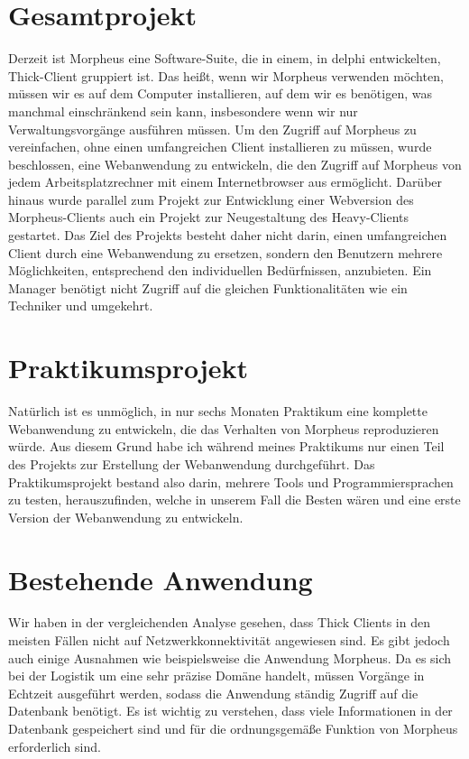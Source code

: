 \documentclass[a4paper, 12pt, french]{article}
\begin{document}
		\section{Gesamtprojekt}
			Derzeit ist Morpheus eine Software-Suite, die in einem, in \gls{delphi} entwickelten, Thick-Client gruppiert ist. Das heißt, wenn wir Morpheus verwenden möchten, müssen wir es auf dem Computer installieren, auf dem wir es benötigen, was manchmal einschränkend sein kann, insbesondere wenn wir nur Verwaltungsvorgänge ausführen müssen. Um den Zugriff auf Morpheus zu vereinfachen, ohne einen umfangreichen Client installieren zu müssen, wurde beschlossen, eine Webanwendung zu entwickeln, die den Zugriff auf Morpheus von jedem Arbeitsplatzrechner mit einem Internetbrowser aus ermöglicht. Darüber hinaus wurde parallel zum Projekt zur Entwicklung einer Webversion des Morpheus-Clients auch ein Projekt zur Neugestaltung des Heavy-Clients gestartet. Das Ziel des Projekts besteht daher nicht darin, einen umfangreichen Client durch eine Webanwendung zu ersetzen, sondern den Benutzern mehrere Möglichkeiten, entsprechend den individuellen Bedürfnissen, anzubieten. Ein Manager benötigt nicht Zugriff auf die gleichen Funktionalitäten wie ein Techniker und umgekehrt.

		\section{Praktikumsprojekt}
			Natürlich ist es unmöglich, in nur sechs Monaten Praktikum eine komplette Webanwendung zu entwickeln, die das Verhalten von Morpheus reproduzieren würde. Aus diesem Grund habe ich während meines Praktikums nur einen Teil des Projekts zur Erstellung der Webanwendung durchgeführt. Das Praktikumsprojekt bestand also darin, mehrere Tools und Programmiersprachen zu testen, herauszufinden, welche in unserem Fall die Besten wären und eine erste Version der Webanwendung zu entwickeln.

		\section{Bestehende Anwendung}
			Wir haben in der vergleichenden Analyse gesehen, dass Thick Clients in den meisten Fällen nicht auf Netzwerkkonnektivität angewiesen sind. Es gibt jedoch auch einige Ausnahmen wie beispielsweise die Anwendung Morpheus. Da es sich bei der Logistik um eine sehr präzise Domäne handelt, müssen Vorgänge in Echtzeit ausgeführt werden, sodass die Anwendung ständig Zugriff auf die Datenbank benötigt. Es ist wichtig zu verstehen, dass viele Informationen in der Datenbank gespeichert sind und für die ordnungsgemäße Funktion von Morpheus erforderlich sind.\\
\end{document}
